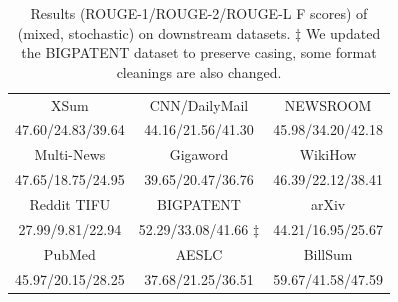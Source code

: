 
\begin{table}[tb]
\begin{minipage}{.5\textwidth}
\scriptsize
\centering
\renewcommand{\arraystretch}{1.3}
\begin{tabular}{ccc}
\hline
XSum & CNN/DailyMail & NEWSROOM \\
47.60/24.83/39.64 & 44.16/21.56/41.30 & 45.98/34.20/42.18  \\ \hline
Multi-News & Gigaword & WikiHow \\ 
47.65/18.75/24.95 & 39.65/20.47/36.76 & 46.39/22.12/38.41 \\ \hline
Reddit TIFU & BIGPATENT & arXiv \\ 
27.99/9.81/22.94 & 52.29/33.08/41.66 $\ddagger$ & 44.21/16.95/25.67 \\ \hline
PubMed & AESLC & BillSum \\ 
45.97/20.15/28.25 & 37.68/21.25/36.51 & 59.67/41.58/47.59  \\ \hline
\end{tabular}
\end{minipage}
\caption{Results (ROUGE-1/ROUGE-2/ROUGE-L F scores) of \pegasuslarge (mixed, stochastic) on downstream datasets. $\ddagger$ 
We updated the BIGPATENT dataset to preserve casing, some format cleanings are also changed. }
\label{tab:mixed}
\end{table}